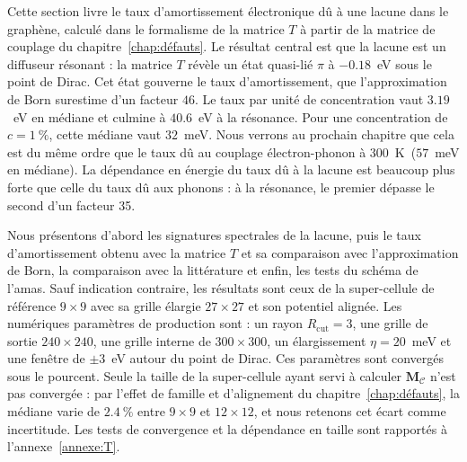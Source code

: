 Cette section livre le taux d'amortissement électronique dû à une lacune dans le graphène, calculé dans le formalisme de la matrice $T$ à partir de la matrice de couplage du chapitre~\ref{chap:défauts}. Le résultat central est que la lacune est un diffuseur résonant : la matrice $T$ révèle un état quasi-lié $\pi$ à $-0.18$~eV sous le point de Dirac. Cet état gouverne le taux d'amortissement, que l'approximation de Born surestime d'un facteur $46$. Le taux par unité de concentration vaut $3.19$~eV en médiane et culmine à $40.6$~eV à la résonance. Pour une concentration de $c=1~\%$, cette médiane vaut $32$~meV. Nous verrons au prochain chapitre que cela est du même ordre que le taux dû au couplage électron-phonon à $300$~K~($57$~meV en médiane). La dépendance en énergie du taux dû à la lacune est beaucoup plus forte que celle du taux dû aux phonons : à la résonance, le premier dépasse le second d'un facteur 35.

Nous présentons d'abord les signatures spectrales de la lacune, puis le taux d'amortissement obtenu avec la matrice $T$ et sa comparaison avec l'approximation de Born, la comparaison avec la littérature et enfin, les tests du schéma de l'amas. Sauf indication contraire, les résultats sont ceux de la super-cellule de référence $9\times 9$ avec sa grille élargie $27\times 27$ et son potentiel alignée. Les numériques paramètres de production sont : un rayon $R_\text{cut}=3$, une grille de sortie $240\times 240$, une grille interne de $300\times 300$, un élargissement $\eta = 20$~meV et une fenêtre de $\pm 3$~eV autour du point de Dirac. Ces paramètres sont convergés sous le pourcent. Seule la taille de la super-cellule ayant servi à calculer $\bm M_\mathcal{C}$ n'est pas convergée : par l'effet de famille et d'alignement du chapitre~\ref{chap:défauts}, la médiane varie de $2.4~\%$ entre $9\times9$ et $12\times12$, et nous retenons cet écart comme incertitude. Les tests de convergence et la dépendance en taille sont rapportés à l'annexe~\ref{annexe:T}.

\bigskip
{}

